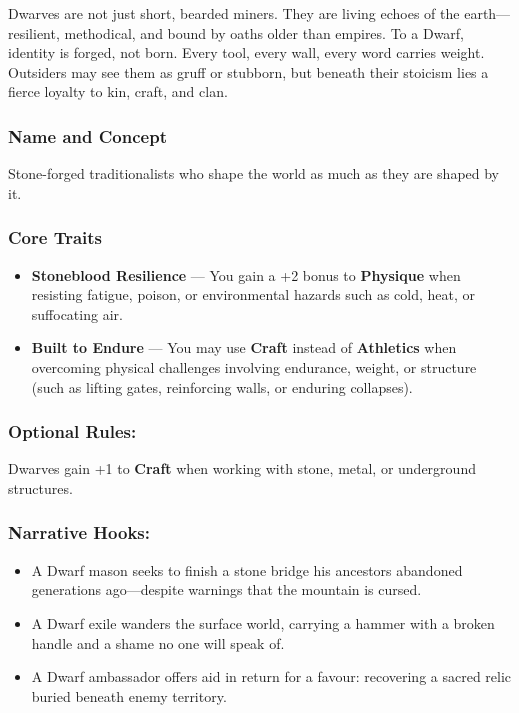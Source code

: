 Dwarves are not just short, bearded miners. They are living echoes of the earth—resilient, methodical, and bound by oaths older than empires. To a Dwarf, identity is forged, not born. Every tool, every wall, every word carries weight. Outsiders may see them as gruff or stubborn, but beneath their stoicism lies a fierce loyalty to kin, craft, and clan.

\subsubsection{Name and Concept}

Stone-forged traditionalists who shape the world as much as they are shaped by it.

\subsubsection*{Core Traits}
\begin{itemize}
  \item \textbf{Stoneblood Resilience} — You gain a +2 bonus to \textbf{Physique} when resisting fatigue, poison, or environmental hazards such as cold, heat, or suffocating air.

  \item \textbf{Built to Endure} — You may use \textbf{Craft} instead of \textbf{Athletics} when overcoming physical challenges involving endurance, weight, or structure (such as lifting gates, reinforcing walls, or enduring collapses).
\end{itemize}

\subsubsection{Optional Rules:} Dwarves gain +1 to \textbf{Craft} when working with stone, metal, or underground structures.

\subsubsection{Narrative Hooks:}
\begin{itemize}
  \item A Dwarf mason seeks to finish a stone bridge his ancestors abandoned generations ago—despite warnings that the mountain is cursed.
  \item A Dwarf exile wanders the surface world, carrying a hammer with a broken handle and a shame no one will speak of.
  \item A Dwarf ambassador offers aid in return for a favour: recovering a sacred relic buried beneath enemy territory.
\end{itemize}

